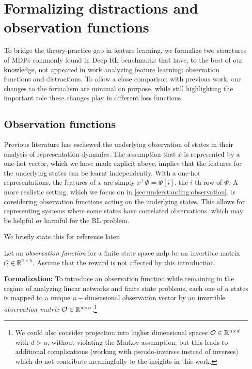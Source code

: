\section{Formalizing distractions and observation functions}
\label{sec:understanding:formalism}
To bridge the theory-practice gap in feature learning, we formalize two structures of MDPs commonly found in Deep RL benchmarks that have, to the best of our knowledge, not appeared in work analyzing feature learning: observation functions and distractions.
To allow a close comparison with previous work, our changes to the formalism are minimal on purpose, while still highlighting the important role these changes play in different loss functions.

\subsection{Observation functions}
Previous literature \parencite{tang2022understanding,tang2023towards,lelan2022generalization} has eschewed the underlying observation of states in their analysis of representation dynamics. 
The assumption that $x$ is represented by a one-hot vector, which we have made explicit above, implies that the features for the underlying states can be learnt independently.
With a one-hot representations, the features of $x$ are simply $x^\top \Phi = \Phi[i]$, the $i$-th row of $\Phi$.
A more realistic setting, which we focus on in \autoref{sec:understanding:observation}, is considering observation functions acting on the underlying states. 
This allows for representing systems where some states have correlated observations, which may be helpful \emph{or} harmful for the RL problem. 

We briefly state this for reference later.
\begin{assumption}
    \label{assumption:understanding:2}
    Let an \emph{observation function} for a finite state space \ac{mdp} be an invertible matrix $\mathcal{O} \in \mathbb{R}^{n \times n}$.
    Assume that the reward is not affected by this introduction.
\end{assumption}

\textbf{Formalization:} To introduce an observation function while remaining in the regime of analyzing linear networks and finite state problems, each one of $n$ states is mapped to a unique $n-$dimensional observation vector by an invertible \emph{observation matrix} ${\mathcal{O}} \in \mathbb{R}^{n \times n}$.\footnote{We could also consider projection into higher dimensional spaces ${\mathcal{O}} \in \mathbb{R}^{n \times d}$ with $d > n$, without violating the Markov assumption, but this leads to additional complications (working with pseudo-inverses instead of inverses) which do not contribute meaningfully to the insights in this work.}

